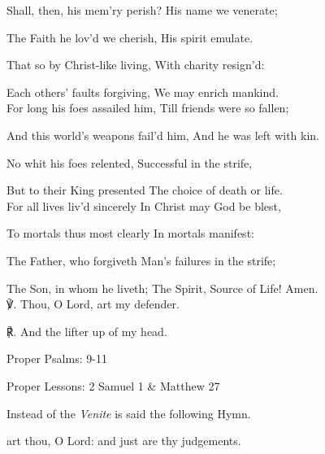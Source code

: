 Shall, then, his mem'ry perish? His name we venerate;

The Faith he lov'd we cherish, His spirit emulate.

That so by Christ-like living, With charity resign'd:

Each others' faults forgiving, We may enrich mankind.\\

For long his foes assailed him, Till friends were so fallen;

And this world's weapons fail'd him, And he was left with kin.

No whit his foes relented, Successful in the strife,

But to their King presented The choice of death or life.\\

For all lives liv'd sincerely In Christ may God be blest,

To mortals thus most clearly In mortals manifest:

The Father, who forgiveth Man's failures in the strife;

The Son, in whom he liveth; The Spirit, Source of Life! Amen.\\

    ℣. Thou, O Lord, art my defender.

	℟. And the lifter up of my head.\\
	


\begin{rubric}
	Proper Psalms: 9-11
\end{rubric}
\begin{rubric}
	Proper Lessons: 2 Samuel 1 \& Matthew 27
\end{rubric}

\begin{rubric}
	Instead of the \emph{Venite} is said the following Hymn.
\end{rubric}

 art thou, O Lord: and just are thy judgements.



